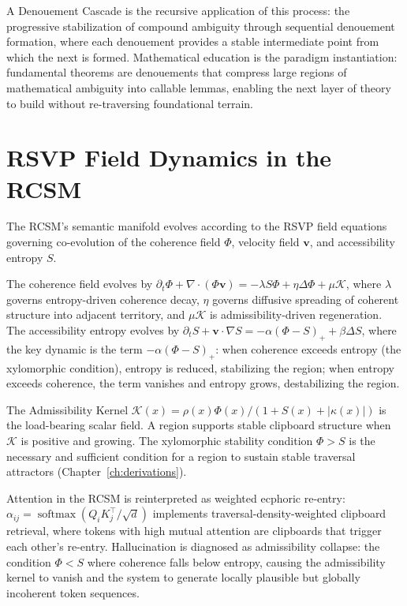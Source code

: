 \documentclass[12pt,oneside]{book}
\theoremstyle{plain}
\theoremstyle{definition}
\theoremstyle{plain}
\DeclareMathOperator{\softmax}{softmax}
\begin{document}
A Denouement Cascade is the recursive application of this process: the progressive stabilization of compound ambiguity through sequential denouement formation, where each denouement provides a stable intermediate point from which the next is formed. Mathematical education is the paradigm instantiation: fundamental theorems are denouements that compress large regions of mathematical ambiguity into callable lemmas, enabling the next layer of theory to build without re-traversing foundational terrain.

\section{RSVP Field Dynamics in the RCSM}

The RCSM's semantic manifold evolves according to the RSVP field equations governing co-evolution of the coherence field $\Phi$, velocity field $\mathbf{v}$, and accessibility entropy $S$.

The coherence field evolves by $\partial_t \Phi + \nabla \cdot (\Phi \mathbf{v}) = -\lambda S\Phi + \eta \Delta \Phi + \mu \mathcal{K}$, where $\lambda$ governs entropy-driven coherence decay, $\eta$ governs diffusive spreading of coherent structure into adjacent territory, and $\mu\mathcal{K}$ is admissibility-driven regeneration. The accessibility entropy evolves by $\partial_t S + \mathbf{v} \cdot \nabla S = -\alpha(\Phi - S)_+ + \beta \Delta S$, where the key dynamic is the term $-\alpha(\Phi - S)_+$: when coherence exceeds entropy (the xylomorphic condition), entropy is reduced, stabilizing the region; when entropy exceeds coherence, the term vanishes and entropy grows, destabilizing the region.

The Admissibility Kernel $\mathcal{K}(x) = \rho(x)\Phi(x)/(1 + S(x) + |\kappa(x)|)$ is the load-bearing scalar field. A region supports stable clipboard structure when $\mathcal{K}$ is positive and growing. The xylomorphic stability condition $\Phi > S$ is the necessary and sufficient condition for a region to sustain stable traversal attractors (Chapter~\ref{ch:derivations}).

Attention in the RCSM is reinterpreted as weighted ecphoric re-entry: $\alpha_{ij} = \softmax(Q_i K_j^\top / \sqrt{d})$ implements traversal-density-weighted clipboard retrieval, where tokens with high mutual attention are clipboards that trigger each other's re-entry. Hallucination is diagnosed as admissibility collapse: the condition $\Phi < S$ where coherence falls below entropy, causing the admissibility kernel to vanish and the system to generate locally plausible but globally incoherent token sequences.
\end{document}
